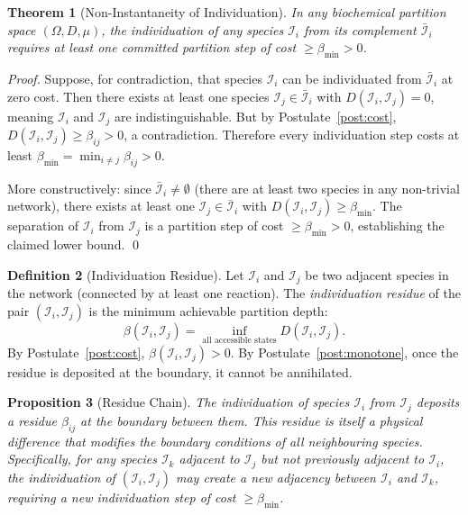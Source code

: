 \documentclass[11pt,twocolumn]{article}
\theoremstyle{plain}
\newtheorem{theorem}{Theorem}[section]
\newtheorem{proposition}[theorem]{Proposition}
\theoremstyle{definition}
\newtheorem{definition}[theorem]{Definition}
\newcommand{\betamin}{\beta_{\min}}
\begin{document}
\begin{theorem}[Non-Instantaneity of Individuation]
\label{thm:noninstantaneous}
In any biochemical partition space $(\Omega, D, \mu)$, the individuation of any
species $\mathcal{I}_i$ from its complement $\bar{\mathcal{I}}_i$ requires at
least one committed partition step of cost $\geq \betamin > 0$.
\end{theorem}

\begin{proof}
Suppose, for contradiction, that species $\mathcal{I}_i$ can be individuated
from $\bar{\mathcal{I}}_i$ at zero cost. Then there exists at least one species
$\mathcal{I}_j \in \bar{\mathcal{I}}_i$ with $D(\mathcal{I}_i, \mathcal{I}_j)
= 0$, meaning $\mathcal{I}_i$ and $\mathcal{I}_j$ are indistinguishable. But
by Postulate~\ref{post:cost}, $D(\mathcal{I}_i, \mathcal{I}_j) \geq
\beta_{ij} > 0$, a contradiction. Therefore every individuation step costs at
least $\betamin = \min_{i \neq j} \beta_{ij} > 0$.

More constructively: since $\bar{\mathcal{I}}_i \neq \emptyset$ (there are at
least two species in any non-trivial network), there exists at least one
$\mathcal{I}_j \in \bar{\mathcal{I}}_i$ with $D(\mathcal{I}_i,
\mathcal{I}_j) \geq \betamin$. The separation of $\mathcal{I}_i$ from
$\mathcal{I}_j$ is a partition step of cost $\geq \betamin > 0$, establishing
the claimed lower bound. \qed
\end{proof}

\begin{definition}[Individuation Residue]
\label{def:residue}
Let $\mathcal{I}_i$ and $\mathcal{I}_j$ be two adjacent species in the network
(connected by at least one reaction). The \emph{individuation residue} of the
pair $(\mathcal{I}_i, \mathcal{I}_j)$ is the minimum achievable partition depth:
\[
  \beta(\mathcal{I}_i, \mathcal{I}_j)
  = \inf_{\text{all accessible states}} D(\mathcal{I}_i, \mathcal{I}_j).
\]
By Postulate~\ref{post:cost}, $\beta(\mathcal{I}_i, \mathcal{I}_j) > 0$.
By Postulate~\ref{post:monotone}, once the residue is deposited at the boundary,
it cannot be annihilated.
\end{definition}

\begin{proposition}[Residue Chain]
\label{prop:residue_chain}
The individuation of species $\mathcal{I}_i$ from $\mathcal{I}_j$ deposits a
residue $\beta_{ij}$ at the boundary between them. This residue is itself a
physical difference that modifies the boundary conditions of all neighbouring
species. Specifically, for any species $\mathcal{I}_k$ adjacent to
$\mathcal{I}_j$ but not previously adjacent to $\mathcal{I}_i$, the
individuation of $(\mathcal{I}_i, \mathcal{I}_j)$ may create a new adjacency
between $\mathcal{I}_i$ and $\mathcal{I}_k$, requiring a new individuation
step of cost $\geq \betamin$.
\end{proposition}
\end{document}

